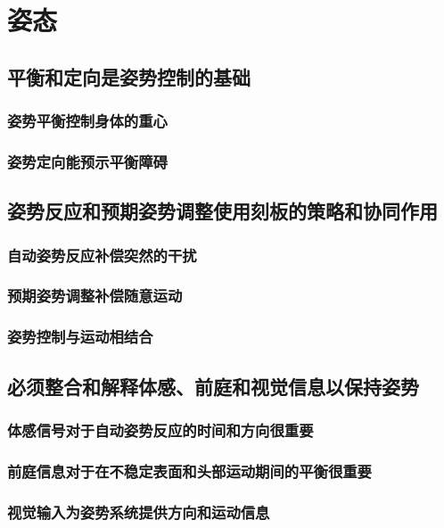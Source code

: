 \chapter{姿态}

\section{平衡和定向是姿势控制的基础}

\subsection{姿势平衡控制身体的重心}
\subsection{姿势定向能预示平衡障碍}

\section{姿势反应和预期姿势调整使用刻板的策略和协同作用}
\subsection{自动姿势反应补偿突然的干扰}
\subsection{预期姿势调整补偿随意运动}
\subsection{姿势控制与运动相结合}

\section{必须整合和解释体感、前庭和视觉信息以保持姿势}
\subsection{体感信号对于自动姿势反应的时间和方向很重要}
\subsection{前庭信息对于在不稳定表面和头部运动期间的平衡很重要}
\subsection{视觉输入为姿势系统提供方向和运动信息}
